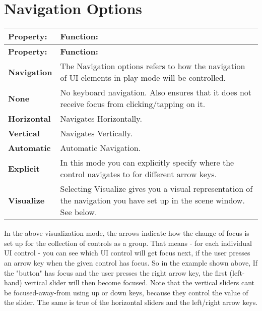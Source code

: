 \chapter{Navigation Options}
\hypertarget{md__hey_tea_9_2_library_2_package_cache_2com_8unity_8ugui_0d1_80_80_2_documentation_0i_2script-_selectable_navigation}{}\label{md__hey_tea_9_2_library_2_package_cache_2com_8unity_8ugui_0d1_80_80_2_documentation_0i_2script-_selectable_navigation}
\label{md__hey_tea_9_2_library_2_package_cache_2com_8unity_8ugui_0d1_80_80_2_documentation_0i_2script-_selectable_navigation_autotoc_md4920}%
%
 

\tabulinesep=1mm
\begin{longtabu}spread 0pt [c]{*{2}{|X[-1]}|}
\hline
\cellcolor{\tableheadbgcolor}\textbf{ {\bfseries{Property\+:}}   }&\cellcolor{\tableheadbgcolor}\textbf{ {\bfseries{Function\+:}}    }\\
\endfirsthead
\hline
\endfoot
\hline
\cellcolor{\tableheadbgcolor}\textbf{ {\bfseries{Property\+:}}   }&\cellcolor{\tableheadbgcolor}\textbf{ {\bfseries{Function\+:}}    }\\
\endhead
{\bfseries{Navigation}}   &The Navigation options refers to how the navigation of UI elements in play mode will be controlled.    \\
{\bfseries{None}}   &No keyboard navigation. Also ensures that it does not receive focus from clicking/tapping on it.    \\
{\bfseries{Horizontal}}   &Navigates Horizontally.    \\
{\bfseries{Vertical}}   &Navigates Vertically.    \\
{\bfseries{Automatic}}   &Automatic Navigation.    \\
{\bfseries{Explicit}}   &In this mode you can explicitly specify where the control navigates to for different arrow keys.    \\
{\bfseries{Visualize}}   &Selecting Visualize gives you a visual representation of the navigation you have set up in the scene window. See below.   \\
\end{longtabu}






In the above visualization mode, the arrows indicate how the change of focus is set up for the collection of controls as a group. That means -\/ for each individual UI control -\/ you can see which UI control will get focus next, if the user presses an arrow key when the given control has focus. So in the example shown above, If the "{}button"{} has focus and the user presses the right arrow key, the first (left-\/hand) vertical slider will then become focused. Note that the vertical sliders can\textquotesingle{}t be focused-\/away-\/from using up or down keys, because they control the value of the slider. The same is true of the horizontal sliders and the left/right arrow keys. 